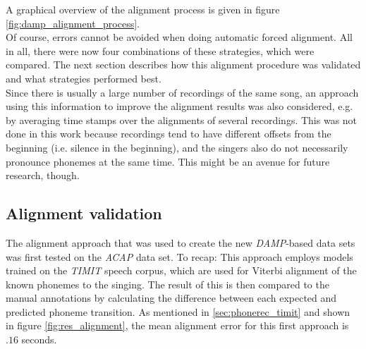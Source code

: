 A graphical overview of the alignment process is given in figure \ref{fig:damp_alignment_process}.\\
Of course, errors cannot be avoided when doing automatic forced alignment. All in all, there were now four combinations of these strategies, which were compared. The next section describes how this alignment procedure was validated and what strategies performed best.\\
Since there is usually a large number of recordings of the same song, an approach using this information to improve the alignment results was also considered, e.g. by averaging time stamps over the alignments of several recordings. This was not done in this work because recordings tend to have different offsets from the beginning (i.e. silence in the beginning), and the singers also do not necessarily pronounce phonemes at the same time. This might be an avenue for future research, though.


\subsection{Alignment validation}
The alignment approach that was used to create the new \textit{DAMP}-based data sets was first tested on the \textit{ACAP} data set. To recap: This approach employs models trained on the \textit{TIMIT} speech corpus, which are used for Viterbi alignment of the known phonemes to the singing. The result of this is then compared to the manual annotations by calculating the difference between each expected and predicted phoneme transition. As mentioned in \ref{sec:phonerec_timit} and shown in figure \ref{fig:res_alignment}, the mean alignment error for this first approach is $.16$ seconds.\\

